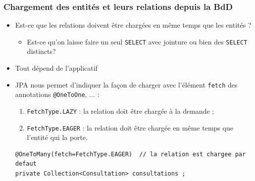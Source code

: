 \documentclass[aspectratio=169,10pt]{beamer}
\begin{document}
\begin{frame}[fragile]
	\frametitle{Chargement des entités et leurs relations depuis la BdD}
	
	\begin{itemize}
		\item Est-ce que les relations doivent être chargées en même temps que les entités ?
		\begin{itemize}
			\item[*] Est-ce qu'on laisse faire un seul \texttt{SELECT} avec jointure ou bien des \texttt{SELECT} distincts? 
		\end{itemize}
		\item Tout dépend de l'applicatif
		\item JPA nous permet d'indiquer la façon de charger avec l'élément \texttt{fetch} des annotations \texttt{@OneToOne}, ... :
		\begin{enumerate}
			\item \texttt{FetchType.LAZY} : la relation doit être chargée à la demande ;
			\item \texttt{FetchType.EAGER} : la relation doit être chargée en même temps que l'entité qui la porte.
		\end{enumerate}
\begin{lstlisting}
@OneToMany(fetch=FetchType.EAGER)  // la relation est chargee par defaut
private Collection<Consultation> consultations ;
\end{lstlisting}		
	\end{itemize}
	
\end{frame}
\end{document}

